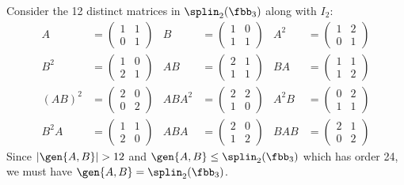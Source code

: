 \begin{sol}
    Consider the 12 distinct matrices in $\splin_2(\fbb_3)$ along with $I_2$:
    \begin{align*}
        A & = 
        \begin{pmatrix}
        1 & 1 \\
        0 & 1
        \end{pmatrix}
        &
        B & = 
        \begin{pmatrix}
        1 & 0 \\
        1 & 1
        \end{pmatrix}
        &
        A^2 & = 
        \begin{pmatrix}
        1 & 2 \\
        0 & 1
        \end{pmatrix}
        \\
        B^2 & = 
        \begin{pmatrix}
        1 & 0 \\
        2 & 1
        \end{pmatrix}
        &
        AB & = 
        \begin{pmatrix}
        2 & 1 \\
        1 & 1
        \end{pmatrix}
        &
        BA & = 
        \begin{pmatrix}
        1 & 1 \\
        1 & 2
        \end{pmatrix}
        \\
        (AB)^2 & = 
        \begin{pmatrix}
        2 & 0 \\
        0 & 2
        \end{pmatrix}
        &
        ABA^2 & = 
        \begin{pmatrix}
        2 & 2 \\
        1 & 0
        \end{pmatrix}
        &
        A^2 B & = 
        \begin{pmatrix}
        0 & 2 \\
        1 & 1
        \end{pmatrix}
        \\
        B^2 A & = 
        \begin{pmatrix}
        1 & 1 \\
        2 & 0
        \end{pmatrix}
        &
        ABA & = 
        \begin{pmatrix}
        2 & 0 \\
        1 & 2
        \end{pmatrix}
        &
        BAB & = 
        \begin{pmatrix}
        2 & 1 \\
        0 & 2
        \end{pmatrix}
    \end{align*}
    Since $|\gen{A, B}| > 12$ and $\gen{A, B} \leq \splin_2(\fbb_3)$ which has order 24, we must have $\gen{A, B} = \splin_2(\fbb_3)$.
\end{sol}

